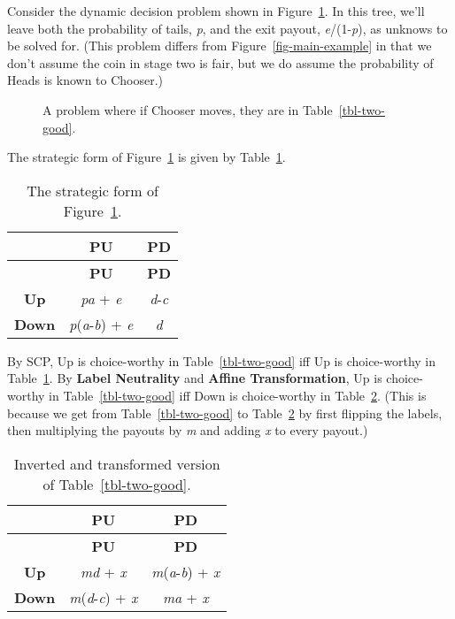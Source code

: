 \documentclass[
  10pt,
  letterpaper,
  DIV=11,
  numbers=noendperiod,
  twoside]{scrartcl}
\begin{document}
Consider the dynamic decision problem shown in
Figure~\ref{fig-two-good}. In this tree, we'll leave both the
probability of tails, \emph{p}, and the exit payout,
\emph{e}/(1-\emph{p}), as unknows to be solved for. (This problem
differs from Figure~\ref{fig-main-example} in that we don't assume the
coin in stage two is fair, but we do assume the probability of Heads is
known to Chooser.)

\begin{figure}


\caption{\label{fig-two-good}A problem where if Chooser moves, they are
in Table~\ref{tbl-two-good}.}

\end{figure}%

The strategic form of Figure~\ref{fig-two-good} is given by
Table~\ref{tbl-two-good-strategic}.

\begin{longtable}[]{@{}ccc@{}}
\caption{The strategic form of
Figure~\ref{fig-two-good}.}\label{tbl-two-good-strategic}\tabularnewline
\toprule\noalign{}
& \textbf{PU} & \textbf{PD} \\
\midrule\noalign{}
\endfirsthead
\toprule\noalign{}
& \textbf{PU} & \textbf{PD} \\
\midrule\noalign{}
\endhead
\bottomrule\noalign{}
\endlastfoot
\textbf{Up} & \emph{pa} + \emph{e} & \emph{d}-\emph{c} \\
\textbf{Down} & \emph{p}(\emph{a}-\emph{b}) + \emph{e} & \emph{d} \\
\end{longtable}

By SCP, Up is choice-worthy in Table~\ref{tbl-two-good} iff Up is
choice-worthy in Table~\ref{tbl-two-good-strategic}. By \textbf{Label
Neutrality} and \textbf{Affine Transformation}, Up is choice-worthy in
Table~\ref{tbl-two-good} iff Down is choice-worthy in
Table~\ref{tbl-two-good-inverted}. (This is because we get from
Table~\ref{tbl-two-good} to Table~\ref{tbl-two-good-inverted} by first
flipping the labels, then multiplying the payouts by \emph{m} and adding
\emph{x} to every payout.)

\begin{longtable}[]{@{}ccc@{}}
\caption{Inverted and transformed version of
Table~\ref{tbl-two-good}.}\label{tbl-two-good-inverted}\tabularnewline
\toprule\noalign{}
& \textbf{PU} & \textbf{PD} \\
\midrule\noalign{}
\endfirsthead
\toprule\noalign{}
& \textbf{PU} & \textbf{PD} \\
\midrule\noalign{}
\endhead
\bottomrule\noalign{}
\endlastfoot
\textbf{Up} & \emph{md} + \emph{x} & \emph{m}(\emph{a}-\emph{b}) +
\emph{x} \\
\textbf{Down} & \emph{m}(\emph{d}-\emph{c}) + \emph{x} & \emph{ma} +
\emph{x} \\
\end{longtable}
\end{document}
